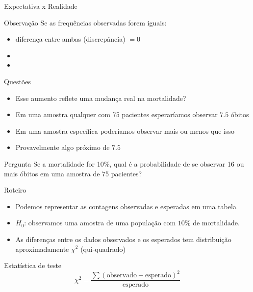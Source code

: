 \documentclass{beamer}
\begin{document}
\begin{frame}{\small Expectativa x Realidade}
  \begin{block}{Observação}
    \scriptsize
    Se as frequências observadas forem iguais:
    \bigskip
    \begin{itemize}
    \footnotesize
    \item diferença entre ambas (discrepância) $= 0$
    \item%
    \item%
    \end{itemize}
    \bigskip
  \end{block}
\end{frame}

\begin{frame}{\scriptsize Questões}
  \begin{itemize}
    \footnotesize
  \item Esse aumento reflete uma mudança real na mortalidade?
  \item Em uma amostra qualquer com 75 pacientes esperaríamos observar $7.5$ óbitos
  \item Em uma amostra específica poderíamos observar mais ou menos
    que isso
  \item Provavelmente algo próximo de $7.5$
  \end{itemize}

  \begin{block}{Pergunta}
    Se a mortalidade for 10\%, qual é a probabilidade de se observar
    16 ou mais óbitos em uma amostra de 75 pacientes?
  \end{block}
\end{frame}

\begin{frame}{\scriptsize Roteiro}
  \begin{itemize}
    \footnotesize
  \item Podemos representar as contagens observadas e esperadas em uma tabela
  \item $H_0$: \alert{observamos uma amostra de uma população com
      $10\%$ de mortalidade}.
  \item As diferenças entre os dados observados e os esperados tem
    distribuição aproximadamente $\chi^2$ (qui-quadrado)
  \end{itemize}
  \begin{block}{Estatística de teste}
    $$\chi^2 = \frac{\sum (\text{observado} - \text{esperado})^2 }{\text{esperado}}$$
  \end{block}
\end{frame}
\end{document}
